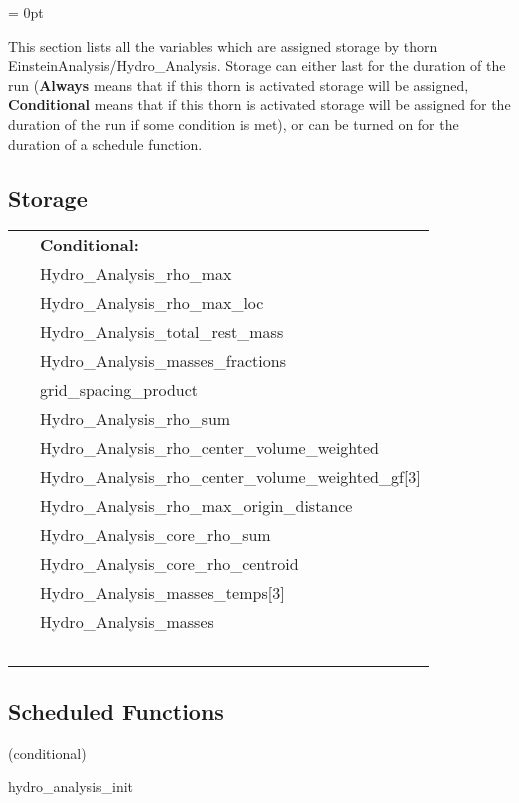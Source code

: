 \parskip = 0pt


\noindent This section lists all the variables which are assigned storage by thorn EinsteinAnalysis/Hydro\_Analysis.  Storage can either last for the duration of the run ({\bf Always} means that if this thorn is activated storage will be assigned, {\bf Conditional} means that if this thorn is activated storage will be assigned for the duration of the run if some condition is met), or can be turned on for the duration of a schedule function.


\subsection*{Storage}

\hspace{5mm}

 \begin{tabular*}{160mm}{ll} 
~& {\bf Conditional:} \\ 
~ &  Hydro\_Analysis\_rho\_max\\ 
~ &  Hydro\_Analysis\_rho\_max\_loc\\ 
~ &  Hydro\_Analysis\_total\_rest\_mass\\ 
~ &  Hydro\_Analysis\_masses\_fractions\\ 
~ &  grid\_spacing\_product\\ 
~ &  Hydro\_Analysis\_rho\_sum\\ 
~ &  Hydro\_Analysis\_rho\_center\_volume\_weighted\\ 
~ &  Hydro\_Analysis\_rho\_center\_volume\_weighted\_gf[3]\\ 
~ &  Hydro\_Analysis\_rho\_max\_origin\_distance\\ 
~ &  Hydro\_Analysis\_core\_rho\_sum\\ 
~ &  Hydro\_Analysis\_core\_rho\_centroid\\ 
~ &  Hydro\_Analysis\_masses\_temps[3]\\ 
~ &  Hydro\_Analysis\_masses\\ 
~ & ~\\ 
\end{tabular*} 


\subsection*{Scheduled Functions}
\vspace{5mm}

   (conditional) 

\hspace{5mm} hydro\_analysis\_init 

